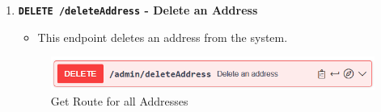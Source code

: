 \begin{enumerate}
        \item \textbf{\texttt{DELETE /deleteAddress} - Delete an Address}
        \begin{itemize}
            \item This endpoint deletes an address from the system.
        \end{itemize} 
        \begin{figure} [H]
            \centering
            \includegraphics [width=1\textwidth] {images/andreas/praxis/deleteAddress.png}
            \caption{Get Route for all Addresses}
        \end{figure}
    \end{enumerate}
    


    



